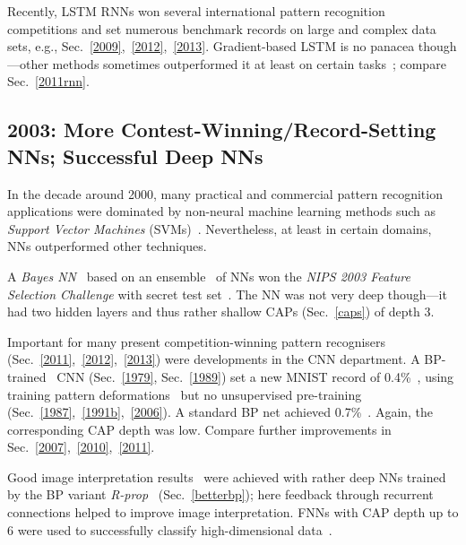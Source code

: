 \documentclass[letterpaper]{article}
\begin{document}
\begin{CJK*}{UTF8}{gbsn}
\begin{sloppypar}
Recently, LSTM RNNs won several international pattern recognition competitions 
and set numerous benchmark records 
on large and complex data sets, e.g., 
Sec.~\ref{2009},~\ref{2012},~\ref{2013}.
Gradient-based LSTM is no panacea though---other methods sometimes outperformed  
it at least on certain tasks~\citep{Jaeger:04,Schmidhuber:07nc,Martens:2011hessfree,pascanu2013,icml2014}; compare Sec.~\ref{2011rnn}.





\subsection{2003: More Contest-Winning/Record-Setting NNs; Successful Deep NNs}
\label{2003}

In the decade around 2000, many practical and commercial
pattern recognition applications were dominated by non-neural
machine learning methods
such as {\em Support Vector Machines} (SVMs)~\citep{Vapnik:95,advkernel}.
Nevertheless, at least in certain domains, NNs 
outperformed other techniques.


A  {\em Bayes NN}~\citep{neal2006b} based on an ensemble~\citep{breiman:1996,Schapire:90,wolpert:92stacked,hashem:1992,Ueda2000,dietterich2000} of NNs won 
the  {\em NIPS 2003 Feature Selection Challenge}
with secret test set~\citep{neal2006}.
The NN was not very deep though---it had two hidden layers
and thus rather shallow CAPs (Sec.~\ref{caps}) of depth 3.

Important for many present competition-winning pattern recognisers  (Sec.~\ref{2011},~\ref{2012},~\ref{2013})
were developments in the CNN department.
A BP-trained~\citep{LeCun:89} CNN (Sec.~\ref{1979}, Sec.~\ref{1989}) 
set a new MNIST record of 0.4\%~\citep{simard:2003},
using training pattern
deformations~\citep{Baird90} but no unsupervised pre-training (Sec.~\ref{1987},~\ref{1991b},~\ref{2006}).
A standard BP net achieved 0.7\%~\citep{simard:2003}.
Again, the corresponding CAP depth was low. 
Compare further improvements in Sec.~\ref{2007},~\ref{2010},~\ref{2011}.



Good image interpretation results~\citep{Behnke:LNCS} were achieved with rather deep NNs trained by the 
BP variant {\em R-prop}~\citep{rprop93} (Sec.~\ref{betterbp});
here feedback through recurrent connections helped to improve image interpretation. 
FNNs with CAP depth up to 6 were used to successfully classify high-dimensional data~\citep{vieira2003}. 


\end{sloppypar}
\end{CJK*}
\end{document}
